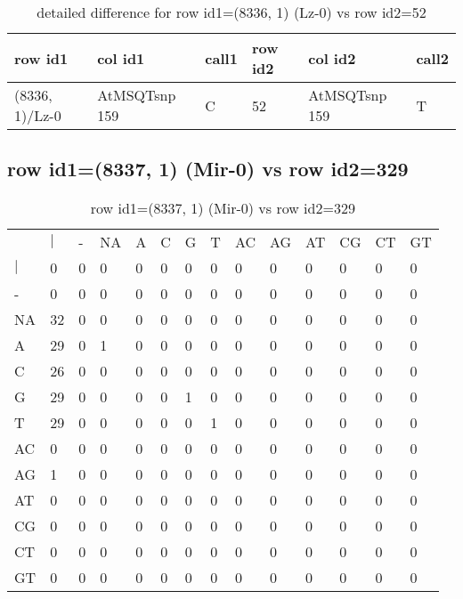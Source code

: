 \begin{center}
\begin{longtable}{|l|l|l|l|l|l|}
\caption{detailed difference for row id1=(8336, 1) (Lz-0) vs row id2=52} \label{table_dm345}\\
\hline
row id1&col id1&call1&row id2&col id2&call2\\
\hline
(8336, 1)/Lz-0&AtMSQTsnp 159&C&52&AtMSQTsnp 159&T\\
\hline
\end{longtable}
\end{center}

\subsection{row id1=(8337, 1) (Mir-0) vs row id2=329}
\begin{center}
\begin{longtable}{|l|l|l|l|l|l|l|l|l|l|l|l|l|l|}
\caption{row id1=(8337, 1) (Mir-0) vs row id2=329} \label{table_dm346}\\
\hline
\\
\hline
&$|$&-&NA&A&C&G&T&AC&AG&AT&CG&CT&GT\\
$|$&0&0&0&0&0&0&0&0&0&0&0&0&0\\
-&0&0&0&0&0&0&0&0&0&0&0&0&0\\
NA&32&0&0&0&0&0&0&0&0&0&0&0&0\\
A&29&0&1&0&0&0&0&0&0&0&0&0&0\\
C&26&0&0&0&0&0&0&0&0&0&0&0&0\\
G&29&0&0&0&0&1&0&0&0&0&0&0&0\\
T&29&0&0&0&0&0&1&0&0&0&0&0&0\\
AC&0&0&0&0&0&0&0&0&0&0&0&0&0\\
AG&1&0&0&0&0&0&0&0&0&0&0&0&0\\
AT&0&0&0&0&0&0&0&0&0&0&0&0&0\\
CG&0&0&0&0&0&0&0&0&0&0&0&0&0\\
CT&0&0&0&0&0&0&0&0&0&0&0&0&0\\
GT&0&0&0&0&0&0&0&0&0&0&0&0&0\\
\hline
\end{longtable}
\end{center}


